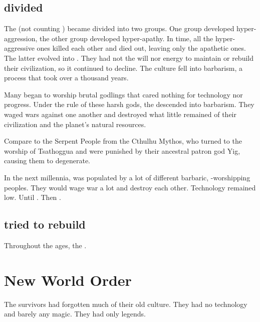 \subsection{\Ophidians divided}
The \ophidians{} (not counting \dragons) became divided into two groups. 
One group developed hyper-aggression, the other group developed hyper-apathy. 
In time, all the hyper-aggressive ones killed each other and died out, leaving only the apathetic ones. 
The latter evolved into \quiljaaran. 
They had not the will nor energy to maintain or rebuild their civilization, so it continued to decline. 
The \ophidian{} culture fell into barbarism, a process that took over a thousand years. 

Many \ophidians began to worship brutal \xs godlings that cared nothing for technology nor progress. 
Under the rule of these harsh gods, the \ophidians descended into barbarism.
They waged wars against one another and destroyed what little remained of their civilization and the planet's natural resources.

Compare to the Serpent People from the Cthulhu Mythos, who turned to the worship of Tsathoggua and were punished by their ancestral patron god Yig, causing them to degenerate. 

In the next millennia, \Miith was populated by a lot of different barbaric, \xs-worshipping peoples. 
They would wage war a lot and destroy each other.
Technology remained low.
Until .
Then . 









\subsection{\Ophidians tried to rebuild}
Throughout the ages, the \ophidians {}.










\section{New World Order}
The survivors had forgotten much of their old culture.
They had no technology and barely any magic. 
They had only legends. 

